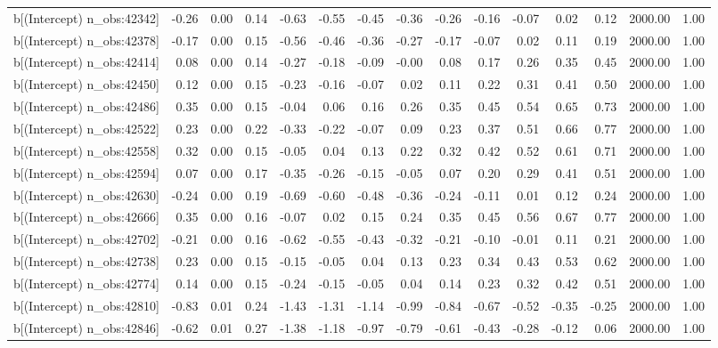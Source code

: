 \begin{table}[ht]
\begin{tabular}{rrrrrrrrrrrrrrr}
  b[(Intercept) n\_obs:42342] & -0.26 & 0.00 & 0.14 & -0.63 & -0.55 & -0.45 & -0.36 & -0.26 & -0.16 & -0.07 & 0.02 & 0.12 & 2000.00 & 1.00 \\ 
  b[(Intercept) n\_obs:42378] & -0.17 & 0.00 & 0.15 & -0.56 & -0.46 & -0.36 & -0.27 & -0.17 & -0.07 & 0.02 & 0.11 & 0.19 & 2000.00 & 1.00 \\ 
  b[(Intercept) n\_obs:42414] & 0.08 & 0.00 & 0.14 & -0.27 & -0.18 & -0.09 & -0.00 & 0.08 & 0.17 & 0.26 & 0.35 & 0.45 & 2000.00 & 1.00 \\ 
  b[(Intercept) n\_obs:42450] & 0.12 & 0.00 & 0.15 & -0.23 & -0.16 & -0.07 & 0.02 & 0.11 & 0.22 & 0.31 & 0.41 & 0.50 & 2000.00 & 1.00 \\ 
  b[(Intercept) n\_obs:42486] & 0.35 & 0.00 & 0.15 & -0.04 & 0.06 & 0.16 & 0.26 & 0.35 & 0.45 & 0.54 & 0.65 & 0.73 & 2000.00 & 1.00 \\ 
  b[(Intercept) n\_obs:42522] & 0.23 & 0.00 & 0.22 & -0.33 & -0.22 & -0.07 & 0.09 & 0.23 & 0.37 & 0.51 & 0.66 & 0.77 & 2000.00 & 1.00 \\ 
  b[(Intercept) n\_obs:42558] & 0.32 & 0.00 & 0.15 & -0.05 & 0.04 & 0.13 & 0.22 & 0.32 & 0.42 & 0.52 & 0.61 & 0.71 & 2000.00 & 1.00 \\ 
  b[(Intercept) n\_obs:42594] & 0.07 & 0.00 & 0.17 & -0.35 & -0.26 & -0.15 & -0.05 & 0.07 & 0.20 & 0.29 & 0.41 & 0.51 & 2000.00 & 1.00 \\ 
  b[(Intercept) n\_obs:42630] & -0.24 & 0.00 & 0.19 & -0.69 & -0.60 & -0.48 & -0.36 & -0.24 & -0.11 & 0.01 & 0.12 & 0.24 & 2000.00 & 1.00 \\ 
  b[(Intercept) n\_obs:42666] & 0.35 & 0.00 & 0.16 & -0.07 & 0.02 & 0.15 & 0.24 & 0.35 & 0.45 & 0.56 & 0.67 & 0.77 & 2000.00 & 1.00 \\ 
  b[(Intercept) n\_obs:42702] & -0.21 & 0.00 & 0.16 & -0.62 & -0.55 & -0.43 & -0.32 & -0.21 & -0.10 & -0.01 & 0.11 & 0.21 & 2000.00 & 1.00 \\ 
  b[(Intercept) n\_obs:42738] & 0.23 & 0.00 & 0.15 & -0.15 & -0.05 & 0.04 & 0.13 & 0.23 & 0.34 & 0.43 & 0.53 & 0.62 & 2000.00 & 1.00 \\ 
  b[(Intercept) n\_obs:42774] & 0.14 & 0.00 & 0.15 & -0.24 & -0.15 & -0.05 & 0.04 & 0.14 & 0.23 & 0.32 & 0.42 & 0.51 & 2000.00 & 1.00 \\ 
  b[(Intercept) n\_obs:42810] & -0.83 & 0.01 & 0.24 & -1.43 & -1.31 & -1.14 & -0.99 & -0.84 & -0.67 & -0.52 & -0.35 & -0.25 & 2000.00 & 1.00 \\ 
  b[(Intercept) n\_obs:42846] & -0.62 & 0.01 & 0.27 & -1.38 & -1.18 & -0.97 & -0.79 & -0.61 & -0.43 & -0.28 & -0.12 & 0.06 & 2000.00 & 1.00 \\ 

\end{tabular}
\end{table}
